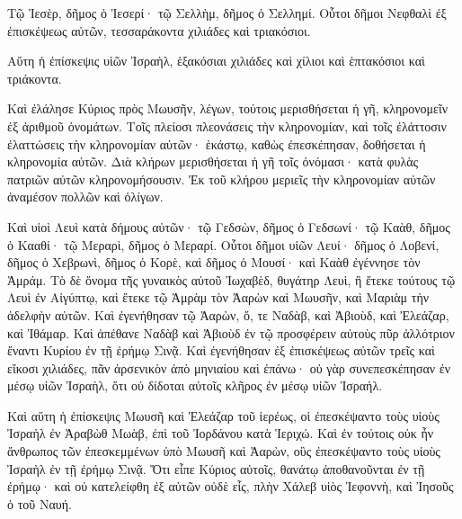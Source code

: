 {Τῷ Ἰεσὲρ, δῆμος ὁ Ἰεσερί· τῷ Σελλὴμ, δῆμος ὁ Σελλημί.
Οὗτοι δῆμοι Νεφθαλὶ ἐξ ἐπισκέψεως αὐτῶν, τεσσαράκοντα χιλιάδες καὶ τριακόσιοι.
\par }{\PP {}Αὕτη ἡ ἐπίσκεψις υἱῶν Ἰσραὴλ, ἑξακόσιαι χιλιάδες καὶ χίλιοι καὶ ἑπτακόσιοι καὶ τριάκοντα.
\par }{\PP {}Καὶ ἐλάλησε Κύριος πρὸς Μωυσῆν, λέγων,
τούτοις μερισθήσεται ἡ γῆ, κληρονομεῖν ἐξ ἀριθμοῦ ὀνομάτων.
Τοῖς πλείοσι πλεονάσεις τὴν κληρονομίαν, καὶ τοῖς ἐλάττοσιν ἐλαττώσεις τὴν κληρονομίαν αὐτῶν· ἑκάστῳ, καθὼς ἐπεσκέπησαν, δοθήσεται ἡ κληρονομία αὐτῶν.
Διὰ κλήρων μερισθήσεται ἡ γῆ τοῖς ὀνόμασι· κατὰ φυλὰς πατριῶν αὐτῶν κληρονομήσουσιν.
Ἐκ τοῦ κλήρου μεριεῖς τὴν κληρονομίαν αὐτῶν ἀναμέσον πολλῶν καὶ ὀλίγων.
\par }{\PP {}Καὶ υἱοὶ Λευὶ κατὰ δήμους αὐτῶν· τῷ Γεδσὼν, δῆμος ὁ Γεδσωνί· τῷ Καὰθ, δῆμος ὁ Κααθί· τῷ Μεραρὶ, δῆμος ὁ Μεραρί.
Οὗτοι δῆμοι υἱῶν Λευί· δῆμος ὁ Λοβενί, δῆμος ὁ Χεβρωνὶ, δῆμος ὁ Κορὲ, καὶ δῆμος ὁ Μουσί· καὶ Καὰθ ἐγέννησε τὸν Ἁμράμ.
Τὸ δὲ ὄνομα τῆς γυναικὸς αὐτοῦ Ἰωχαβὲδ, θυγάτηρ Λευὶ, ἣ ἔτεκε τούτους τῷ Λευὶ ἐν Αἰγύπτῳ, καὶ ἔτεκε τῷ Ἀμρὰμ τὸν Ἀαρὼν καὶ Μωυσῆν, καὶ Μαριὰμ τὴν ἀδελφὴν αὐτῶν.
Καὶ ἐγενήθησαν τῷ Ἀαρὼν, ὅ, τε Ναδὰβ, καὶ Ἀβιοὺδ, καὶ Ἐλεάζαρ, καὶ Ἰθάμαρ.
Καὶ ἀπέθανε Ναδὰβ καὶ Ἀβιοὺδ ἐν τῷ προσφέρειν αὐτοὺς πῦρ ἀλλότριον ἔναντι Κυρίου ἐν τῇ ἐρήμῳ Σινᾷ.
Καὶ ἐγενήθησαν ἐξ ἐπισκέψεως αὐτῶν τρεῖς καὶ εἴκοσι χιλιάδες, πᾶν ἀρσενικὸν ἀπὸ μηνιαίου καὶ ἐπάνω· οὐ γὰρ συνεπεσκέπησαν ἐν μέσῳ υἱῶν Ἰσραὴλ, ὅτι οὐ δίδοται αὐτοῖς κλῆρος ἐν μέσῳ υἱῶν Ἰσραήλ.
\par }{\PP {}Καὶ αὕτη ἡ ἐπίσκεψις Μωυσῆ καὶ Ἐλεάζαρ τοῦ ἱερέως, οἱ ἐπεσκέψαντο τοὺς υἱοὺς Ἰσραὴλ ἐν Ἀραβὼθ Μωὰβ, ἐπὶ τοῦ Ἰορδάνου κατὰ Ἱεριχώ.
Καὶ ἐν τούτοις οὐκ ἦν ἄνθρωπος τῶν ἐπεσκεμμένων ὑπὸ Μωυσῆ καὶ Ἀαρὼν, οὓς ἐπεσκέψαντο τοὺς υἱοὺς Ἰσραὴλ ἐν τῇ ἐρήμῳ Σινᾷ.
Ὅτι εἶπε Κύριος αὐτοῖς, θανάτῳ ἀποθανοῦνται ἐν τῇ ἐρήμῳ· καὶ οὐ κατελείφθη ἐξ αὐτῶν οὐδὲ εἷς, πλὴν Χάλεβ υἱὸς Ἰεφοννὴ, καὶ Ἰησοῦς ὁ τοῦ Ναυή.

}
